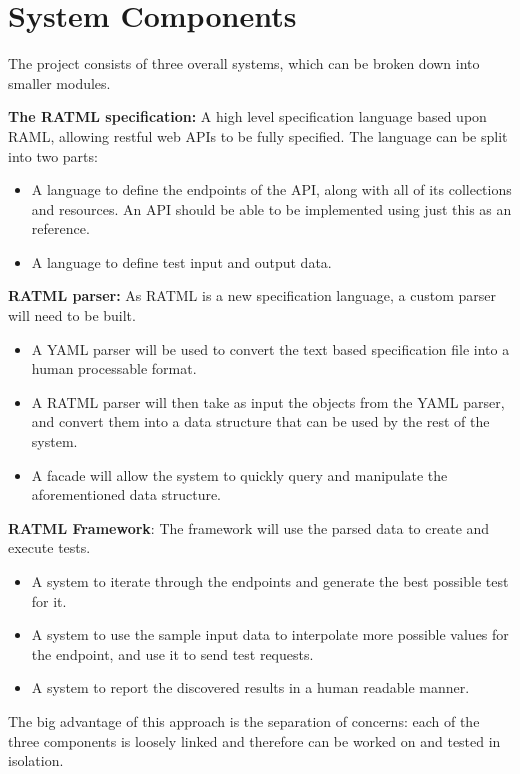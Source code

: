 \section{System Components}

The project consists of three overall systems, which can be broken down into smaller modules.

\textbf{The RATML specification:} A high level specification language based upon RAML, allowing restful web APIs to be fully specified. The language can be split into two parts:
\begin{itemize}
\item A language to define the endpoints of the API, along with all of its collections and resources. An API should be able to be implemented using just this as an reference.
\item A language to define test input and output data.
\end{itemize}

\textbf{RATML parser:} As RATML is a new specification language, a custom parser will need to be built.
\begin{itemize}
\item A YAML parser will be used to convert the text based specification file into a human processable format.
\item A RATML parser will then take as input the objects from the YAML parser, and convert them into a data structure that can be used by the rest of the system.
\item A facade will allow the system to quickly query and manipulate the aforementioned data structure.
\end{itemize}

\textbf{RATML Framework}: The framework will use the parsed data to create and execute tests.
\begin{itemize}
\item A system to iterate through the endpoints and generate the best possible test for it.
\item A system to use the sample input data to interpolate more possible values for the endpoint, and use it to send test requests.
\item A system to report the discovered results in a human readable manner.
\end{itemize}

The big advantage of this approach is the separation of concerns: each of the three components is loosely linked and therefore can be worked on and tested in isolation.

